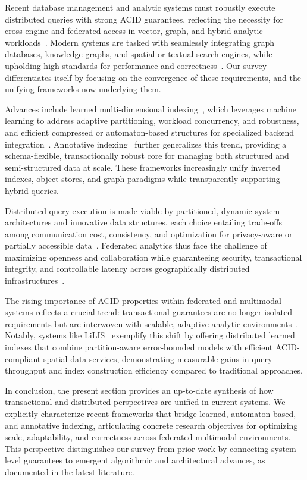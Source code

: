 \documentclass[sigconf]{acmart}
\begin{document}
Recent database management and analytic systems must robustly execute distributed queries with strong ACID guarantees, reflecting the necessity for cross-engine and federated access in vector, graph, and hybrid analytic workloads~\cite{ref80,ref87,ref110}. Modern systems are tasked with seamlessly integrating graph databases, knowledge graphs, and spatial or textual search engines, while upholding high standards for performance and correctness~\cite{ref79,ref110,ref112}. Our survey differentiates itself by focusing on the convergence of these requirements, and the unifying frameworks now underlying them.

Advances include learned multi-dimensional indexing~\cite{ref110}, which leverages machine learning to address adaptive partitioning, workload concurrency, and robustness, and efficient compressed or automaton-based structures for specialized backend integration~\cite{ref79}. Annotative indexing~\cite{ref112} further generalizes this trend, providing a schema-flexible, transactionally robust core for managing both structured and semi-structured data at scale. These frameworks increasingly unify inverted indexes, object stores, and graph paradigms while transparently supporting hybrid queries.

Distributed query execution is made viable by partitioned, dynamic system architectures and innovative data structures, each choice entailing trade-offs among communication cost, consistency, and optimization for privacy-aware or partially accessible data~\cite{ref80,ref81,ref82,ref88,ref89}. Federated analytics thus face the challenge of maximizing openness and collaboration while guaranteeing security, transactional integrity, and controllable latency across geographically distributed infrastructures~\cite{ref91,ref93,ref95}.

The rising importance of ACID properties within federated and multimodal systems reflects a crucial trend: transactional guarantees are no longer isolated requirements but are interwoven with scalable, adaptive analytic environments~\cite{ref110,ref111,ref112}. Notably, systems like LiLIS~\cite{ref111} exemplify this shift by offering distributed learned indexes that combine partition-aware error-bounded models with efficient ACID-compliant spatial data services, demonstrating measurable gains in query throughput and index construction efficiency compared to traditional approaches.

In conclusion, the present section provides an up-to-date synthesis of how transactional and distributed perspectives are unified in current systems. We explicitly characterize recent frameworks that bridge learned, automaton-based, and annotative indexing, articulating concrete research objectives for optimizing scale, adaptability, and correctness across federated multimodal environments. This perspective distinguishes our survey from prior work by connecting system-level guarantees to emergent algorithmic and architectural advances, as documented in the latest literature.
\end{document}
